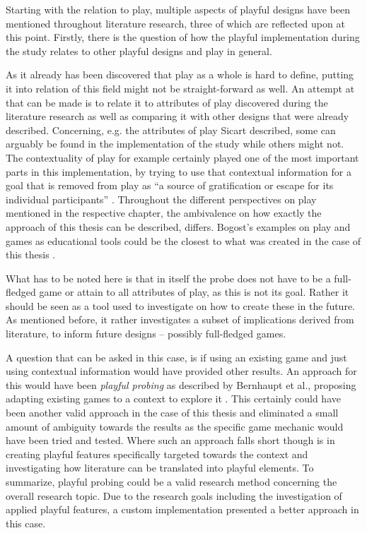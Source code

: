 Starting with the relation to play, multiple aspects of playful designs have been mentioned throughout literature research, three of which are reflected upon at this point. Firstly, there is the question of how the playful implementation during the study relates to other playful designs and play in general.

As it already has been discovered that play as a whole is hard to define, putting it into relation of this field might not be straight-forward as well. An attempt at that can be made is to relate it to attributes of play discovered during the literature research as well as comparing it with other designs that were already described. Concerning, e.g. the attributes of play Sicart described, some can arguably be found in the implementation of the study while others might not. The contextuality of play for example \cite[p. 6]{sicart2014play} certainly played one of the most important parts in this implementation, by trying to use that contextual information for a goal that is removed from play as \enquote{a source of gratification or escape for its individual participants} \cite[p. 213]{wein2000suttonreview}. Throughout the different perspectives on play mentioned in the respective chapter, the ambivalence on how exactly the approach of this thesis can be described, differs. Bogost's examples on play and games as educational tools could be the closest to what was created in the case of this thesis \cite{bogost2007persuasive}.

What has to be noted here is that in itself the probe does not have to be a full-fledged game or attain to all attributes of play, as this is not its goal. Rather it should be seen as a tool used to investigate on how to create these in the future. As mentioned before, it rather investigates a subset of implications derived from literature, to inform future designs -- possibly full-fledged games.

A question that can be asked in this case, is if using an existing game and just using contextual information would have provided other results. An approach for this would have been \textit{playful probing} as described by Bernhaupt et al., proposing adapting existing games to a context to explore it \cite{bernhaupt2007playful}. This certainly could have been another valid approach in the case of this thesis and eliminated a small amount of ambiguity towards the results as the specific game mechanic would have been tried and tested. Where such an approach falls short though is in creating playful features specifically targeted towards the context and investigating how literature can be translated into playful elements. To summarize, playful probing could be a valid research method concerning the overall research topic. Due to the research goals including the investigation of applied playful features, a custom implementation presented a better approach in this case.

